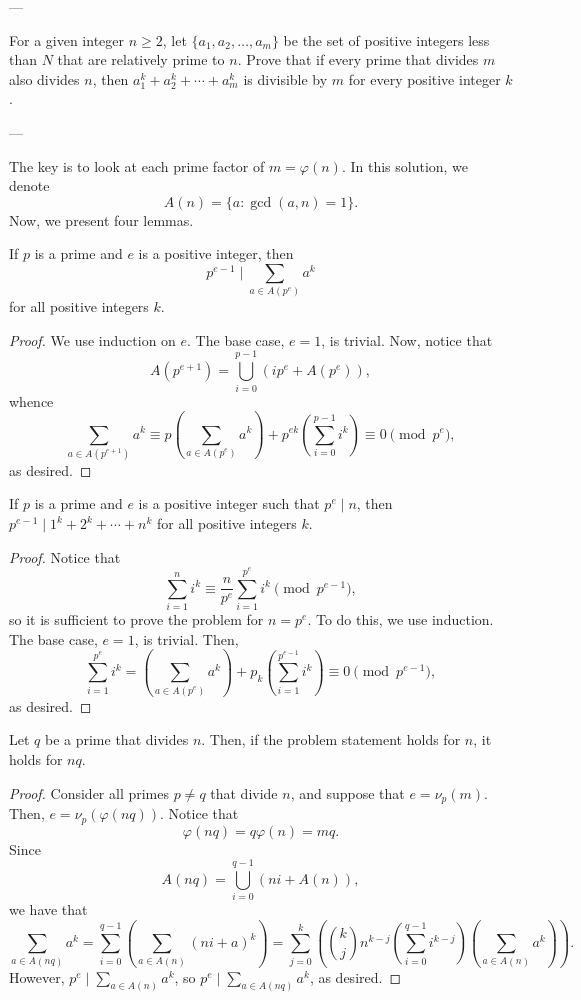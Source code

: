 
---

For a given integer $n\ge 2$, let $\{a_1,a_2,\ldots,a_m\}$ be the set of positive integers less than $N$ that are relatively prime to $n$. Prove that if every prime that divides $m$ also divides $n$, then $a_1^k+a_2^k+\cdots+a_m^k$ is divisible by $m$ for every positive integer $k$.

---

The key is to look at each prime factor of $m=\varphi(n)$. In this solution, we denote \[A(n)=\{a:\gcd(a,n)=1\}.\]
Now, we present four lemmas.
\begin{boxlemma}
    If $p$ is a prime and $e$ is a positive integer, then \[p^{e-1}\mid\sum_{a\in A(p^e)}a^k\]
    for all positive integers $k$.
\end{boxlemma}
\begin{proof}
    We use induction on $e$. The base case, $e=1$, is trivial. Now, notice that \[A\left(p^{e+1}\right)=\bigcup_{i=0}^{p-1}(ip^e+A\left(p^e\right)),\]
    whence \[\sum_{a\in A\left(p^{e+1}\right)}a^k\equiv p\left(\sum_{a\in A(p^e)}a^k\right)+p^{ek}\left(\sum_{i=0}^{p-1}i^k\right)\equiv 0\pmod{p^e},\]
    as desired.
\end{proof}
\begin{boxlemma}
    If $p$ is a prime and $e$ is a positive integer such that $p^e\mid n$, then $p^{e-1}\mid 1^k+2^k+\cdots+n^k$ for all positive integers $k$.
\end{boxlemma}
\begin{proof}
    Notice that \[\sum_{i=1}^n i^k\equiv\frac{n}{p^e}\sum_{i=1}^{p^e} i^k\pmod{p^{e-1}},\]
    so it is sufficient to prove the problem for $n=p^e$. To do this, we use induction. The base case, $e=1$, is trivial. Then, \[\sum_{i=1}^{p^e}i^k=\left(\sum_{a\in A(p^e)}a^k\right)+p_k\left(\sum_{i=1}^{p^{e-1}}i^k\right)\equiv 0\pmod{p^{e-1}},\]
    as desired.
\end{proof}
\begin{boxlemma}
    Let $q$ be a prime that divides $n$. Then, if the problem statement holds for $n$, it holds for $nq$.
\end{boxlemma}
\begin{proof}
    Consider all primes $p\ne q$ that divide $n$, and suppose that $e=\nu_p(m)$. Then, $e=\nu_p(\varphi(nq))$. Notice that \[\varphi(nq)=q\varphi(n)=mq.\]
    Since \[A(nq)=\bigcup_{i=0}^{q-1}(ni+A(n)),\]
    we have that \[\sum_{a\in A(nq)}a^k=\sum_{i=0}^{q-1}\left(\sum_{a\in A(n)}(ni+a)^k\right)=\sum_{j=0}^k\left(\binom kj n^{k-j}\left(\sum_{i=0}^{q-1}i^{k-j}\right)\left(\sum_{a\in A(n)}a^k\right)\right).\]
    However, $p^e\mid\sum_{a\in A(n)}a^k$, so $p^e\mid\sum_{a\in A(nq)}a^k$, as desired.
\end{proof}
